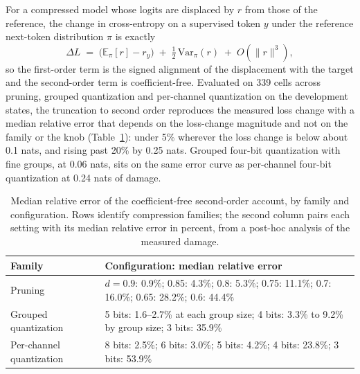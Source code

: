 For a compressed model whose logits are displaced by $r$ from those of the reference, the change
in cross-entropy on a supervised token $y$ under the reference next-token distribution $\pi$ is
exactly
\begin{equation}
\Delta L \;=\; \big(\mathbb{E}_{\pi}[r]-r_y\big)\;+\;\tfrac12\,\mathrm{Var}_{\pi}(r)\;+\;O(\lVert r\rVert^3),
\label{eq:displacement}
\end{equation}
so the first-order term is the signed alignment of the displacement with the target and the
second-order term is coefficient-free. Evaluated on 339 cells across pruning, grouped quantization
and per-channel quantization on the development states, the truncation to second order reproduces
the measured loss change with a median relative error that depends on the loss-change magnitude and not on the
family or the knob (Table~\ref{tab:disp_boundary}): under 5\% wherever the loss change is below about
0.1 nats, and rising past 20\% by 0.25 nats. Grouped four-bit quantization with fine groups, at 0.06 nats, sits on the same error curve as per-channel four-bit quantization at 0.24 nats of damage.

\begin{table}[tb]
\normalfont
\centering\small
%
\caption{Median relative error of the coefficient-free second-order account, by family and
configuration. Rows identify compression families; the second column pairs each setting with its median relative error in percent, from a \mbox{post-hoc} analysis of the measured damage.}
\label{tab:disp_boundary}
\begin{tabular*}{\textwidth}{@{\extracolsep{\fill}}>{\raggedright\arraybackslash\hspace{0pt}}p{}>{\raggedright\arraybackslash\hspace{0pt}}p{}@{}}
\toprule
Family & Configuration: median relative error \\
\midrule
Pruning & $d=0.9$: 0.9\%; 0.85: 4.3\%; 0.8: 5.3\%; 0.75: 11.1\%; 0.7: 16.0\%; 0.65: 28.2\%; 0.6: 44.4\% \\
Grouped quantization & 5 bits: 1.6--2.7\% at each group size; 4 bits: 3.3\% to 9.2\% by group size; 3 bits: 35.9\% \\
Per-channel quantization & 8 bits: 2.5\%; 6 bits: 3.0\%; 5 bits: 4.2\%; 4 bits: 23.8\%; 3 bits: 53.9\% \\
\bottomrule
\end{tabular*}
%
\end{table}

